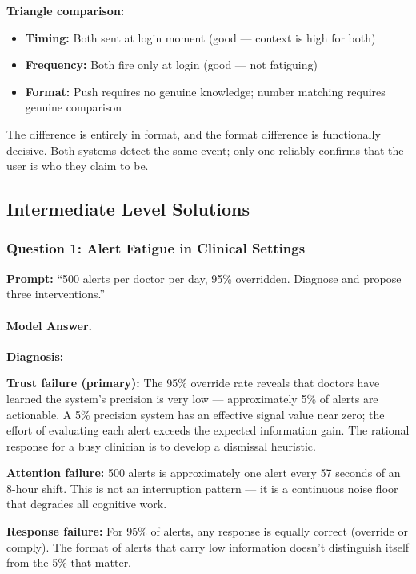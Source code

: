\textbf{Triangle comparison:}
\begin{itemize}
    \item \textbf{Timing:} Both sent at login moment (good --- context is high for both)
    \item \textbf{Frequency:} Both fire only at login (good --- not fatiguing)
    \item \textbf{Format:} Push requires no genuine knowledge; number matching requires genuine comparison
\end{itemize}

The difference is entirely in format, and the format difference is functionally decisive. Both systems detect the same event; only one reliably confirms that the user is who they claim to be.

\subsection{Intermediate Level Solutions}

\subsubsection{Question 1: Alert Fatigue in Clinical Settings}

\textbf{Prompt:} ``500 alerts per doctor per day, 95\% overridden. Diagnose and propose three interventions.''

\paragraph{Model Answer.}

\textbf{Diagnosis:}

\textbf{Trust failure (primary):} The 95\% override rate reveals that doctors have learned the system's precision is very low --- approximately 5\% of alerts are actionable. A 5\% precision system has an effective signal value near zero; the effort of evaluating each alert exceeds the expected information gain. The rational response for a busy clinician is to develop a dismissal heuristic.

\textbf{Attention failure:} 500 alerts is approximately one alert every 57 seconds of an 8-hour shift. This is not an interruption pattern --- it is a continuous noise floor that degrades all cognitive work.

\textbf{Response failure:} For 95\% of alerts, any response is equally correct (override or comply). The format of alerts that carry low information doesn't distinguish itself from the 5\% that matter.

